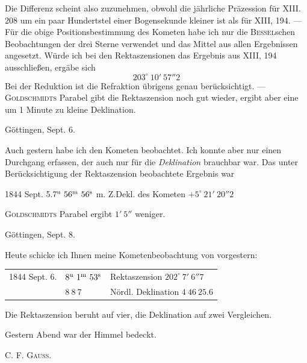 Die Differenz scheint also zuzunehmen, obwohl die jährliche Präzession für XIII. 208 um ein paar Hundertstel einer Bogensekunde kleiner ist als für XIII, 194. --- Für die obige Positionsbestimmung des Kometen habe ich nur die \textsc{Bessel}schen Beobachtungen der drei Sterne verwendet und das Mittel aus allen Ergebnissen angesetzt. Würde ich bei den Rektaszensionen das Ergebnis aus XIII, 194 ausschließen, ergäbe sich
\[
203^\circ\ 10'\ 57''2
\]
\noindent Bei der Reduktion ist die Refraktion übrigens genau berücksichtigt. --- \textsc{Goldschmidts} Parabel gibt die Rektaszension noch gut wieder, ergibt aber eine um 1 Minute zu kleine Deklination.

\begin{flushright}Göttingen, Sept. 6.\end{flushright}

Auch gestern habe ich den Kometen beobachtet. Ich konnte aber nur einen Durchgang erfassen, der auch nur für die \emph{Deklination} brauchbar war. Das unter Berücksichtigung der Rektaszension beobachtete Ergebnis war

\begin{center}
1844 Sept. 5.\quad $7^{\rm u}\ 56^{\rm m}\ 56^{\rm s}$ m. Z.\quad Dekl. des Kometen $+5^\circ\ 21'\ 20''2$
\end{center}

\textsc{Goldschmidts} Parabel ergibt $1'\ 5''$ weniger.

\begin{flushright}Göttingen, Sept. 8.\end{flushright}

Heute schicke ich Ihnen meine Kometenbeobachtung von vorgestern:

\begin{center}
\setlength{\tabcolsep}{3pt}
\begin{tabular}{lll}
1844 Sept. 6. & $8^{\rm u}\ 1^{\rm m}\ 53^{\rm s}$ & Rektaszension $202^\circ\ 7'\ 6''7$ \\
 & $8\ 8\ 7$ & Nördl. Deklination $4\ 46\ 25.6$ \\
\end{tabular}
\end{center}

Die Rektaszension beruht auf vier, die Deklination auf zwei Vergleichen.

Gestern Abend war der Himmel bedeckt.
\begin{flushright}C. F. \textsc{Gauss}.\end{flushright}
